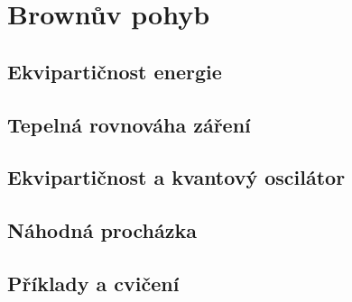 \chapter{Brownův pohyb}\label{fyz:IchapXLI}
\minitoc
  \section{Ekvipartičnost energie}\label{fyz:IchapXLIsecI}
  \section{Tepelná rovnováha záření}\label{fyz:IchapXLIsecII}
  \section{Ekvipartičnost a kvantový oscilátor}\label{fyz:IchapXLIsecIII}
  \section{Náhodná procházka}\label{fyz:IchapXLIsecIV}
  \section{Příklady a cvičení}\label{fyz:IchapXLIsecV}